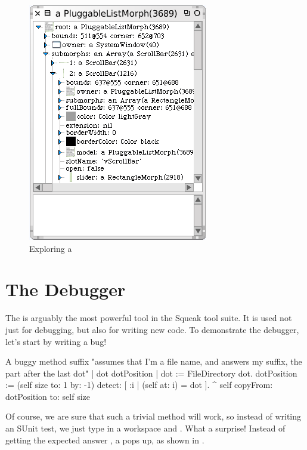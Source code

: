 \documentclass[a4paper,10pt,twoside]{book}
\begin{document}
\begin{figure}[tbp]
	\begin{center}
		\includegraphics[scale=0.7]{explorePluggableListMorph}
	\end{center}
	\caption{Exploring a }
	\label{fig:explorePluggableListMorph}
\end{figure}

\section{The Debugger}
\label{sec:debugger} %

The  is arguably the most powerful tool in the Squeak tool suite.  It is used not just for debugging, but also for writing new code.
To demonstrate the debugger, let's start by writing a bug!


\needspace{10ex}
\begin{method}[buggy]{A buggy method}
suffix
	"assumes that I'm a file name, and answers my suffix, the part after the last dot"
	| dot dotPosition |
	dot := FileDirectory dot.
	dotPosition := (self size to: 1 by: -1) detect: [ :i | (self at: i) = dot ].
	^ self copyFrom: dotPosition to: self size 
\end{method}

Of course, we are sure that such a trivial method will work, so instead of writing an SUnit test, we just type
 in a workspace and .
What a surprise!  Instead of getting the expected answer , a  pops up, as shown in .
\end{document}
